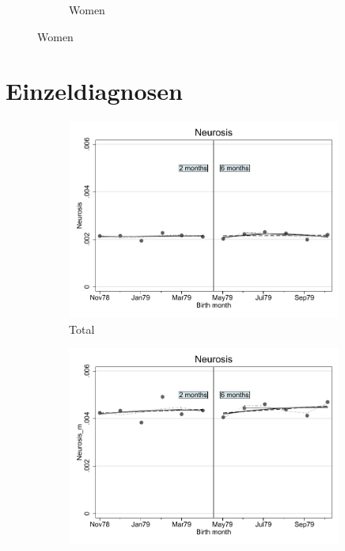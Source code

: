 \documentclass[a4paper ]{article}
\begin{document}
\begin{figure}[h!]
\begin{subfigure}[t]{0.31\textwidth}
		\caption{Women}
	\end{subfigure}
\end{figure}
\newpage
\section{Einzeldiagnosen}
\begin{figure}[h]
	\centering
	\begin{subfigure}[t]{0.31\textwidth}
		\centering
		\includegraphics[width=0.99\textwidth]{R1_RD_Neurosis_fits}
		\caption{Total}		
	\end{subfigure}
	\begin{subfigure}[t]{0.31\textwidth}
		\centering
		\includegraphics[width=0.99\textwidth]{R1_RD_Neurosis_m_fits}

\end{subfigure}
\end{figure}
\end{document}
